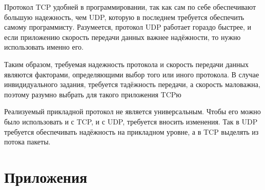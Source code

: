 \documentclass[a4paper]{article}
\begin{document}
Протокол TCP удобней в программировании, так как сам по себе обеспечивают большую надежность, чем UDP, которую в последнем требуется обеспечить самому программисту. Разумеется, протокол UDP работает гораздо быстрее, и если приложению скорость передачи данных важнее надёжности, то нужно использовать именно его.
 
Таким образом,  требуемая надежность протокола и скорость передачи данных являются факторами, определяющими выбор того или иного протокола. В случае инвидидуального задания, требуется тадёжность передачи, а скорость маловажна, поэтому разумно выбрать для такого приложения TCPю

Реализуемый прикладной протокол не является универсальным. Чтобы его можно было использовать и с TCP, и с UDP, требуется вносить изменения. Так в UDP требуется обеспечивать надёжность на прикладном уровне, а в TCP выделять из потока пакеты.
\newpage
\section{Приложения}

















\end{document}
